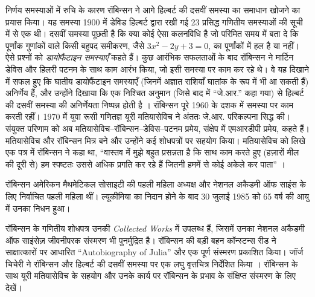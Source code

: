 \documentclass[../../../include/open-logic-section]{subfiles}
\begin{document}
निर्णय समस्याओं में रुचि के कारण रॉबिन्सन ने आगे हिल्बर्ट की दसवीं समस्या
का समाधान खोजने का प्रयास किया। यह समस्या 1900 में डेविड हिल्बर्ट द्वारा
रखी गई 23 प्रसिद्ध गणितीय समस्याओं की सूची में से एक थी। दसवीं समस्या पूछती
है कि क्या कोई ऐसा कलनविधि है जो परिमित समय में बता दे कि पूर्णांक गुणांकों
वाले किसी बहुपद समीकरण, जैसे $3x^2 - 2y +3 = 0$, का पूर्णांकों में हल है या
नहीं। ऐसे प्रश्नों को \emph{डायोफैंटाइन समस्याएँ} कहते हैं। कुछ आरंभिक
सफलताओं के बाद रॉबिन्सन ने मार्टिन डेविस और हिलरी पटनम के साथ काम आरंभ किया,
जो इसी समस्या पर काम कर रहे थे। वे यह दिखाने में सफल हुए कि घातीय
डायोफैंटाइन समस्याएँ (जिनमें अज्ञात राशियाँ घातांक के रूप में भी आ सकती हैं)
अनिर्णेय हैं, और उन्होंने दिखाया कि एक निश्चित अनुमान (जिसे बाद में
``जे.आर.'' कहा गया) से हिल्बर्ट की दसवीं समस्या की अनिर्णेयता निष्पन्न होती
है \citep{DavisPutnamRobinson1961}। रॉबिन्सन पूरे 1960 के दशक में समस्या पर
काम करती रहीं। 1970 में युवा रूसी गणितज्ञ यूरी मतियासेविच ने अंततः जे.आर.
परिकल्पना सिद्ध की। संयुक्त परिणाम को अब
मतियासेविच--रॉबिन्सन--डेविस--पटनम प्रमेय, संक्षेप में एमआरडीपी प्रमेय, कहते
हैं। मतियासेविच और रॉबिन्सन मित्र बने और उन्होंने कई शोधपत्रों पर सहयोग
किया। मतियासेविच को लिखे एक पत्र में रॉबिन्सन ने कहा था, ``वास्तव में मुझे
बहुत प्रसन्नता है कि साथ काम करते हुए (हज़ारों मील की दूरी से) हम स्पष्टतः
उससे अधिक प्रगति कर रहे हैं जितनी हममें से कोई अकेले कर पाता''
\citep[45]{Matijasevich1992}।

रॉबिन्सन अमेरिकन मैथमेटिकल सोसाइटी की पहली महिला अध्यक्ष और नेशनल अकैडमी ऑफ
साइंस के लिए निर्वाचित पहली महिला थीं। ल्यूकीमिया का निदान होने के बाद 30
जुलाई 1985 को 65 वर्ष की आयु में उनका निधन हुआ।

\begin{reading}
रॉबिन्सन के गणितीय शोधपत्र उनकी \textit{Collected Works}
\citep{Robinson1996} में उपलब्ध हैं, जिसमें उनका नेशनल अकैडमी ऑफ साइंसेज़
जीवनीपरक संस्मरण \citep{Feferman1994} भी पुनर्मुद्रित है। रॉबिन्सन की बड़ी
बहन कॉन्स्टन्स रीड ने साक्षात्कारों पर आधारित ``Autobiography of Julia''
\citep{Reid1986} और एक पूर्ण संस्मरण \citep{Reid1996} प्रकाशित किया। जॉर्ज
चिचेरी ने रॉबिन्सन और हिल्बर्ट की दसवीं समस्या पर एक लघु वृत्तचित्र निर्देशित
किया \citep{Csicsery2016}। रॉबिन्सन के साथ यूरी मतियासेविच के सहयोग और उनके
कार्य पर रॉबिन्सन के प्रभाव के संक्षिप्त संस्मरण के लिए
\citep{Matijasevich1992} देखें।
\end{reading}
\end{document}
